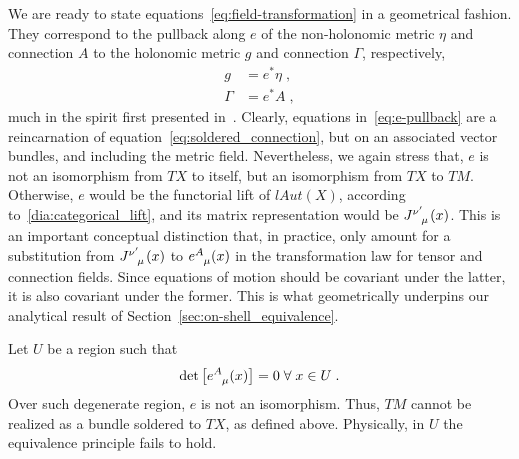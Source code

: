 \documentclass[../../main.tex]{subfiles}
\begin{document}
We are ready to state equations~\eqref{eq:field-transformation} in a geometrical fashion. They correspond to the pullback along $e$ of the non-holonomic metric $\eta$ and connection $A$ to the holonomic metric $g$ and connection $\Gamma$, respectively,
\begin{subequations}\label{eq:e-pullback}
  \begin{align}
    g      & = e^* \eta \;, \label{eq:e-pullback-of-nonholonomic-metric}  \\
    \Gamma & = e^* A \;, \label{eq:e-pullback-of-nonholonomic-connection}
  \end{align}
\end{subequations}
much in the spirit first presented in~\cite{giachetti1980}. Clearly, equations in~\eqref{eq:e-pullback} are a reincarnation of equation~\eqref{eq:soldered_connection}, but on an associated vector bundles, and including the metric field. Nevertheless, we again stress that, $e$ is not an isomorphism from $TX$ to itself, but an isomorphism from $TX$ to $TM$. Otherwise, $e$ would be the functorial lift of $lAut\left(X\right)$, according to~\ref{dia:categorical_lift}, and its matrix representation would be $\tensor{J}{^{\nu'}_\mu}(x)$. This is an important conceptual distinction that, in practice, only amount for a substitution from $\tensor{J}{^{\nu'}_\mu}(x)$ to $\tensor{e}{^A_\mu}(x)$ in the transformation law for tensor and connection fields. Since equations of motion should be covariant under the latter, it is also covariant under the former. This is what geometrically underpins our analytical result of Section~\ref{sec:on-shell_equivalence}.

Let $ U $ be a region such that
\begin{equation}\label{eq:degenerate}
  \det\left[\tensor{e}{^A_\mu}(x)\right]=0 \; \forall \; x \in U \;.
\end{equation}
Over such degenerate region, $ e $ is not an isomorphism. Thus, $TM$ cannot be realized as a bundle soldered to $TX$, as defined above. Physically, in $U$ the equivalence principle fails to hold.
\end{document}
